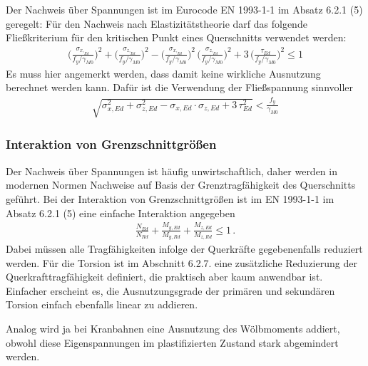 Der Nachweis \"{u}ber Spannungen ist im Eurocode EN 1993-1-1 im Absatz 6.2.1 (5) geregelt: F\"{u}r den Nachweis nach Elastizit\"{a}tstheorie darf das folgende Flie{\ss}kriterium f\"{u}r den kritischen Punkt eines Querschnitts verwendet werden:
\begin{align}
\bigg(\frac{\sigma_{x,_{Ed}}}{f_y /\gamma_{M0}}\bigg)^2 + \bigg(\frac{\sigma_{z,_{Ed}}}{f_y /\gamma_{M0}}\bigg)^2 - \bigg(\frac{\sigma_{x,_{Ed}}}{f_y /\gamma_{M0}}\bigg)^2 \,\bigg(\frac{\sigma_{z,_{Ed}}}{f_y /\gamma_{M0}}\bigg)^2 + 3\,\bigg(\frac{\tau_{Ed}}{f_y/\gamma_{M0}}\bigg)^2 \leq 1
\end{align}
Es muss hier angemerkt werden, dass damit keine wirkliche Ausnutzung berechnet werden kann. Daf\"{u}r ist die Verwendung der Flie{\ss}spannung sinnvoller
\begin{align}
\sqrt{\sigma_{x,Ed}^2 + \sigma_{z,Ed}^2 - \sigma_{x,Ed} \cdot \sigma_{z,Ed} + 3\,\tau_{Ed}^2} < \frac{f_y}{\gamma_{M0}}
\end{align}
{\textcolor{sectionTitleBlue}{\subsubsection*{Interaktion von Grenzschnittgr\"{o}{\ss}en }}}

Der Nachweis \"{u}ber Spannungen ist h\"{a}ufig unwirtschaftlich, daher werden in modernen Normen Nachweise auf Basis der Grenztragf\"{a}higkeit des Querschnitts gef\"{u}hrt. Bei der Interaktion von Grenzschnittgr\"{o}{\ss}en ist im EN 1993-1-1 im Absatz 6.2.1 (5) eine einfache Interaktion angegeben
\begin{align}
\frac{N_{Ed}}{N_{Rd}} + \frac{M_{y,Ed}}{M_{y,Rd}} + \frac{M_{z,Ed}}{M_{z,Rd}} \leq 1\,.
\end{align}
Dabei m\"{u}ssen alle Tragf\"{a}higkeiten infolge der Querkr\"{a}fte gegebenenfalls reduziert werden. F\"{u}r die Torsion ist im Abschnitt 6.2.7. eine zus\"{a}tzliche Reduzierung der Querkrafttragf\"{a}higkeit definiert, die praktisch aber kaum anwendbar ist. Einfacher erscheint es, die Ausnutzungsgrade der prim\"{a}ren und sekund\"{a}ren Torsion einfach ebenfalls linear zu addieren.

Analog wird ja bei Kranbahnen eine Ausnutzung des W\"{o}lbmoments addiert, obwohl diese Eigenspannungen im plastifizierten Zustand stark abgemindert werden.

